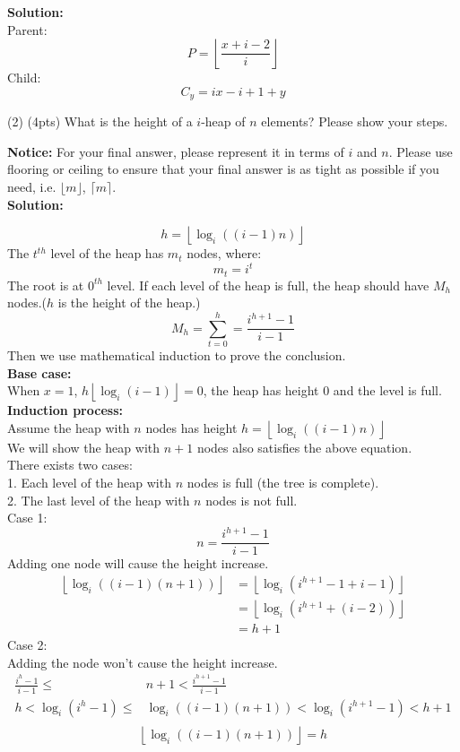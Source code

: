 \documentclass[10.5pt]{article}
\begin{document}
\textbf{Solution:}\\
Parent:
$$
P = \left\lfloor\frac{x + i - 2}{i}\right\rfloor
$$
Child:
$$
C_y = ix - i + 1 + y
$$

\newpage
(2) (4pts) What is the height of a $i$-heap of $n$ elements? Please show your steps.

\textbf{Notice: }For your final answer, please represent it in terms of $i$ and $n$. Please use flooring or ceiling to ensure that your final answer is as tight as possible if you need, i.e. $\lfloor m \rfloor$, $\lceil m \rceil$.
~\\

\textbf{Solution:}

$$
h = \left\lfloor\log_i((i-1)n)\right\rfloor
$$
The $t^{th}$ level of the heap has $m_t$ nodes, where:
$$
m_t = i^t
$$
The root is at $0^{th}$ level.
If each level of the heap is full, the heap should have $M_h$ nodes.($h$ is the height of the heap.)
$$
M_h = \sum_{t = 0} ^ h = \frac{i^{h + 1} - 1}{i-1}
$$
Then we use mathematical induction to prove the conclusion.\\
\textbf{Base case:}\\
When $x = 1$, $h \left\lfloor\log_i(i - 1)\right\rfloor = 0$, the heap has height $0$ and the level is full.\\
\textbf{Induction process:}\\
Assume the heap with $n$ nodes has height $h = \left\lfloor\log_i((i-1)n)\right\rfloor$\\
We will show the heap with $n + 1$ nodes also satisfies the above equation.\\
There exists two cases:\\
1. Each level of the heap with $n$ nodes is full (the tree is complete).\\
2. The last level of the heap with $n$ nodes is not full.\\
Case 1:\\
$$
n = \frac{i^{h + 1} - 1}{i-1}
$$
Adding one node will cause the height increase.
\begin{align*}
\left\lfloor\log_i((i-1)(n + 1))\right\rfloor &= \left\lfloor\log_i(i^{h+1} - 1 + i -1)\right\rfloor\\
&=\left\lfloor\log_i\left(i^{h + 1 }+ (i - 2)\right)\right\rfloor \\
&= h + 1
\end{align*}
Case 2:\\
Adding the node won't cause the height increase.
\begin{align*}
\frac{i^{h} - 1}{i-1} \le &n + 1 < \frac{i^{h + 1} - 1}{i-1}\\
h < \log_i(i^{h} - 1)\le &\log_i((i - 1)(n + 1)) < \log_i\left(i^{h + 1}-1\right) < h + 1\\
\end{align*}
$$
\left\lfloor\log_i((i - 1)(n + 1))\right\rfloor = h
$$
\end{document}
